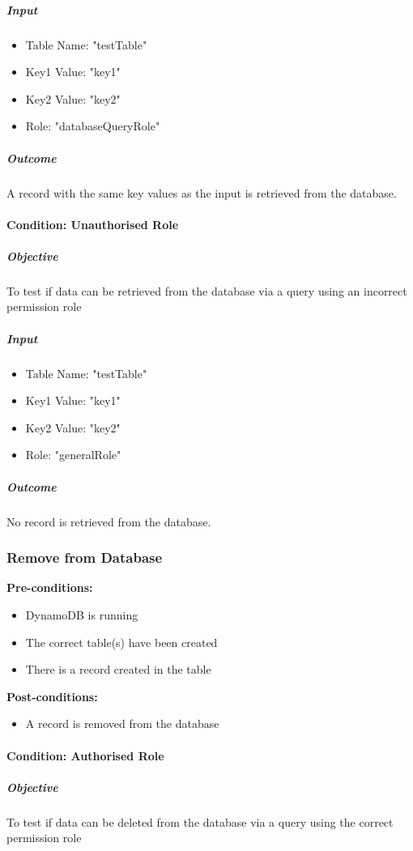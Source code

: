 \documentclass{article}
\begin{document}
				\subparagraph{Input}
					\begin{itemize}
						\item Table Name: "testTable"
						\item Key1 Value: "key1"
						\item Key2 Value: "key2"
						\item Role: "databaseQueryRole"
					\end{itemize}
			
				\subparagraph{Outcome}
					A record with the same key values as the input is retrieved from the database.
			
			\paragraph{Condition: Unauthorised Role}
				\subparagraph{Objective}
					To test if data can be retrieved from the database via a query using an incorrect permission role
				
				\subparagraph{Input}
					\begin{itemize}
						\item Table Name: "testTable"
						\item Key1 Value: "key1"
						\item Key2 Value: "key2"
						\item Role: "generalRole"
					\end{itemize}
				
				\subparagraph{Outcome}
					No record is retrieved from the database.
		
		\subsubsection{Remove from Database}
			\textbf{Pre-conditions:}
			\begin{itemize}
				\item DynamoDB is running
				\item The correct table(s) have been created
				\item There is a record created in the table
			\end{itemize}
			\textbf{Post-conditions:}
			\begin{itemize}
				\item A record is removed from the database
			\end{itemize}
			
			\paragraph{Condition: Authorised Role}
				\subparagraph{Objective}
					To test if data can be deleted from the database via a query using the correct permission role
				
\end{document}
